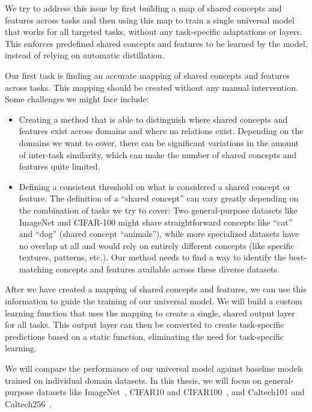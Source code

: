 We try to address this issue by first building a map of shared concepts and features across tasks
and then using this map to train a single universal model that works for all targeted tasks,
without any task-specific adaptations or layers.
This enforces predefined shared concepts and features to be learned by the model,
instead of relying on automatic distillation.

Our first task is finding an accurate mapping of shared concepts and features across tasks.
This mapping should be created without any manual intervention.
Some challenges we might face include:
\begin{itemize}
    \item Creating a method that is able to distinguish where shared concepts and features exist across domains
          and where no relations exist.
          Depending on the domains we want to cover, there can be significant variations in the amount of inter-task similarity,
          which can make the number of shared concepts and features quite limited.
    \item Defining a consistent threshold on what is considered a shared concept or feature.
          The definition of a \enquote{shared concept} can vary greatly depending on the combination of tasks we try to cover:
          Two general-purpose datasets like ImageNet and CIFAR-100 might share straightforward concepts like \enquote{cat} and \enquote{dog} (shared concept \enquote{animals}),
          while more specialized datasets have no overlap at all and would rely on entirely different concepts
          (like specific textures, patterns, etc.).
          Our method needs to find a way to identify the best-matching concepts and features available across these diverse datasets.
\end{itemize}

After we have created a mapping of shared concepts and features, we can use this information to guide the training of our universal model.
We will build a custom learning function that uses the mapping to create a single, shared output layer for all tasks.
This output layer can then be converted to create task-specific predictions based on a static function,
eliminating the need for task-specific learning.

We will compare the performance of our universal model against baseline models trained on individual domain datasets.
In this thesis, we will focus on general-purpose datasets like ImageNet~\cite{deng_imagenet_2009,russakovsky_imagenet_2015},
CIFAR10 and CIFAR100~\cite{krizhevsky_learning_2009}, and Caltech101 and Caltech256~\cite{li_caltech_2022,griffin_caltech_2022}.
